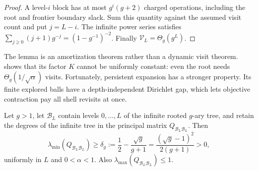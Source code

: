 \begin{proof}
A level-$i$ block has at most $g^i(g+2)$ charged operations, including the
root and frontier boundary slack.  Sum this quantity against the assumed
visit count and put $j=L-i$.  The infinite power series satisfies
$\sum_{j\geq0}(j+1)g^{-j}=(1-g^{-1})^{-2}$.  Finally
$\mathcal V_L=\Theta_g(g^L)$.
\end{proof}

The lemma is an amortization theorem rather than a dynamic visit theorem.
 shows that its factor $K$ cannot be
uniformly constant: even the root needs $\Theta_g(1/\sqrt\alpha)$ visits.
Fortunately, persistent expansion has a stronger property.  Its finite
explored balls have a depth-independent Dirichlet gap, which lets objective
contraction pay all shell revisits at once.

\begin{lemma}
\label{lem:direct-homogeneous-dirichlet-gap}
Let $g>1$, let $\mathcal B_L$ contain levels $0,\ldots,L$ of the infinite
rooted $g$-ary tree, and retain the degrees of the infinite tree in the
principal matrix $Q_{\mathcal B_L\mathcal B_L}$.  Then
\begin{equation}
 \lambda_{\min}(Q_{\mathcal B_L\mathcal B_L})
 \geq
 \delta_g
 :=\frac12-\frac{\sqrt g}{g+1}
 =\frac{(\sqrt g-1)^2}{2(g+1)}>0,
 \label{eq:direct-homogeneous-dirichlet-gap}
\end{equation}
uniformly in $L$ and $0<\alpha<1$.  Also
$\lambda_{\max}(Q_{\mathcal B_L\mathcal B_L})\leq1$.
\end{lemma}

